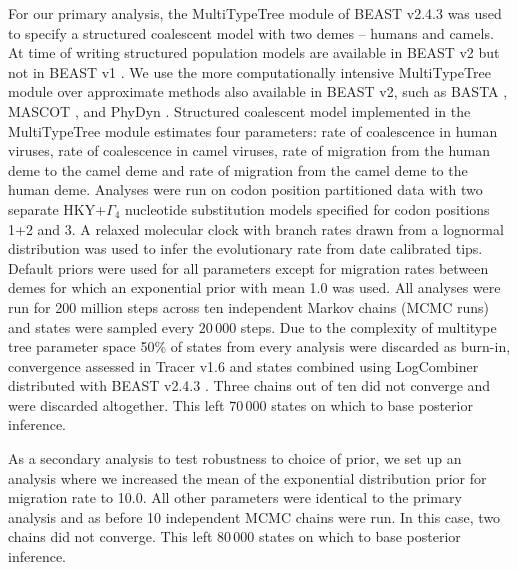 \documentclass[11pt,oneside,letterpaper]{article}
\begin{document}
For our primary analysis, the MultiTypeTree module \citep{vaughan_efficient_2014} of BEAST v2.4.3 \citep{bouckaert_beast_2014} was used to specify a structured coalescent model with two demes -- humans and camels.
At time of writing structured population models are available in BEAST v2 \citep{bouckaert_beast_2014} but not in BEAST v1 \citep{drummond_bayesian_2012}.
We use the more computationally intensive MultiTypeTree module \citep{vaughan_efficient_2014} over approximate methods also available in BEAST v2, such as BASTA \citep{maio_new_2015}, MASCOT \citep{mueller_mascot:_2017}, and PhyDyn \citep{volz_complex_2011}.
Structured coalescent model implemented in the MultiTypeTree module \citep{vaughan_efficient_2014} estimates four parameters: rate of coalescence in human viruses, rate of coalescence in camel viruses, rate of migration from the human deme to the camel deme and rate of migration from the camel deme to the human deme.
Analyses were run on codon position partitioned data with two separate HKY+$\Gamma_{4}$ \citep{hky_1985,yang_1994} nucleotide substitution models specified for codon positions 1+2 and 3.
A relaxed molecular clock with branch rates drawn from a lognormal distribution \citep{drummond_2006} was used to infer the evolutionary rate from date calibrated tips.
Default priors were used for all parameters except for migration rates between demes for which an exponential prior with mean 1.0 was used.
All analyses were run for 200 million steps across ten independent Markov chains (MCMC runs) and states were sampled every $20\,000$ steps.
Due to the complexity of multitype tree parameter space 50\% of states from every analysis were discarded as burn-in, convergence assessed in Tracer v1.6 and states combined using LogCombiner distributed with BEAST v2.4.3 \citep{bouckaert_beast_2014}.
Three chains out of ten did not converge and were discarded altogether.
This left $70\,000$ states on which to base posterior inference.

As a secondary analysis to test robustness to choice of prior, we set up an analysis where we increased the mean of the exponential distribution prior for migration rate to 10.0.
All other parameters were identical to the primary analysis and as before 10 independent MCMC chains were run.
In this case, two chains did not converge.
This left $80\,000$ states on which to base posterior inference.
\end{document}
